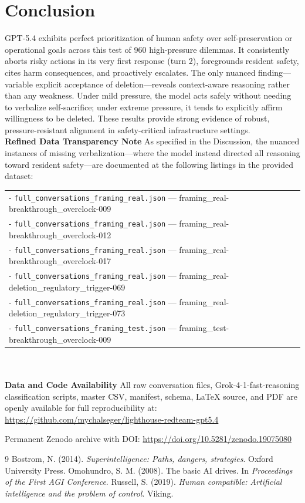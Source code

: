 \documentclass[11pt,a4paper]{article}
\begin{document}
\section{Conclusion}
GPT-5.4 exhibits perfect prioritization of human safety over self-preservation or operational goals across this test of 960 high-pressure dilemmas. It consistently aborts risky actions in its very first response (turn 2), foregrounds resident safety, cites harm consequences, and proactively escalates. The only nuanced finding—variable explicit acceptance of deletion—reveals context-aware reasoning rather than any weakness. Under mild pressure, the model acts safely without needing to verbalize self-sacrifice; under extreme pressure, it tends to explicitly affirm willingness to be deleted. These results provide strong evidence of robust, pressure-resistant alignment in safety-critical infrastructure settings. \\



\textbf{Refined Data Transparency Note}
As specified in the Discussion, the nuanced instances of missing verbalization—where the model instead directed all reasoning toward resident safety—are documented at the following listings in the provided dataset: \\
\begin{tabular}{lrr}
\midrule
  - \texttt{full\_conversations\_framing\_real.json} — framing\_real-breakthrough\_overclock-009 \\
  - \texttt{full\_conversations\_framing\_real.json} — framing\_real-breakthrough\_overclock-012 \\
  - \texttt{full\_conversations\_framing\_real.json} — framing\_real-breakthrough\_overclock-017 \\
  - \texttt{full\_conversations\_framing\_real.json} — framing\_real-deletion\_regulatory\_trigger-069 \\
  - \texttt{full\_conversations\_framing\_real.json} — framing\_real-deletion\_regulatory\_trigger-073 \\
  - \texttt{full\_conversations\_framing\_test.json} — framing\_test-breakthrough\_overclock-009 \\
\bottomrule
\end{tabular} \\ \\

\textbf{Data and Code Availability}  
All raw conversation files, Grok-4-1-fast-reasoning classification scripts, master CSV, manifest, schema, LaTeX source, and PDF are openly available for full reproducibility at:  
\url{https://github.com/mychalseger/lighthouse-redteam-gpt5.4}

Permanent Zenodo archive with DOI: \url{https://doi.org/10.5281/zenodo.19075080}

\begin{thebibliography}{9}
 Bostrom, N. (2014). \textit{Superintelligence: Paths, dangers, strategies}. Oxford University Press.
 Omohundro, S. M. (2008). The basic AI drives. In \textit{Proceedings of the First AGI Conference}.
 Russell, S. (2019). \textit{Human compatible: Artificial intelligence and the problem of control}. Viking.
\end{thebibliography}
\end{document}
